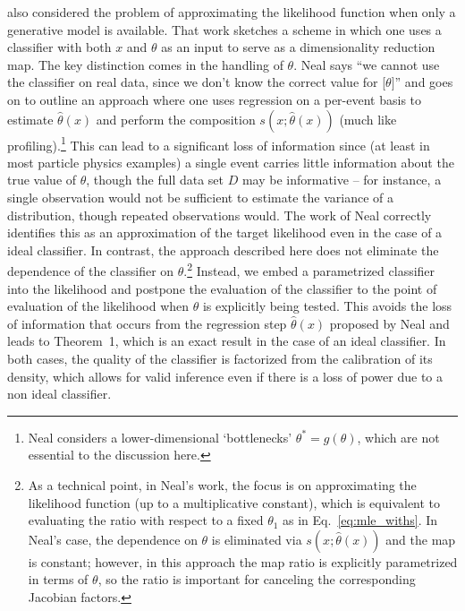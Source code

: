 \documentclass[12pt]{article}
\numberwithin{equation}{section}
\theoremstyle{plain}
\begin{document}
\cite{Neal:2007zz} also considered the problem of approximating the likelihood
function when only a generative model is available. That work sketches a scheme
in which one uses a classifier with both $x$ and $\theta$ as an input to serve
as a dimensionality reduction map. The key distinction comes in the handling of
$\theta$.  Neal says  ``we cannot use the classifier on real data, since we
don't know the correct value for [$\theta]$'' and goes on to outline an approach
where one uses regression on a per-event basis to estimate $\hat{\theta}(x)$ and
perform the composition $s(x; \hat{\theta}(x))$ (much like
profiling).\footnote{Neal considers a lower-dimensional `bottlenecks'
$\theta^*=g(\theta)$, which are not essential to the discussion here.}  This can
lead to a significant loss of information since (at least in most particle
physics examples) a single event carries little information about the true value
of $\theta$, though the full data set $D$ may be informative -- for instance, a
single observation would not be sufficient to estimate the variance of a
distribution, though repeated observations would.  The work of Neal correctly
identifies this as an approximation of the target likelihood even in the case of
a ideal classifier. In contrast, the approach described here does not eliminate
the dependence of the classifier on $\theta$.\footnote{As a technical point,
in Neal's work, the focus is on approximating the likelihood function (up to a
multiplicative constant), which is equivalent to evaluating the ratio  with
respect to a fixed $\theta_1$ as in Eq.~\ref{eq:mle_withs}. In Neal's case, the
dependence on $\theta$ is eliminated via $s(x; \hat{\theta}(x))$ and the map is
constant; however, in this approach the map ratio is explicitly parametrized in
terms of $\theta$, so the ratio is important for canceling the corresponding
Jacobian factors.} Instead, we embed a parametrized classifier into the
likelihood and postpone the evaluation of the classifier to the point of
evaluation of the likelihood when $\theta$ is explicitly being tested. This
avoids the loss of information that occurs from the regression step
$\hat{\theta}(x)$ proposed by Neal and leads to Theorem~1, which is an exact
result in the case of an ideal classifier. In both cases, the quality of the
classifier is factorized from the calibration of its density, which allows for
valid inference even if there is a loss of power due to a non ideal classifier.


\end{document}
